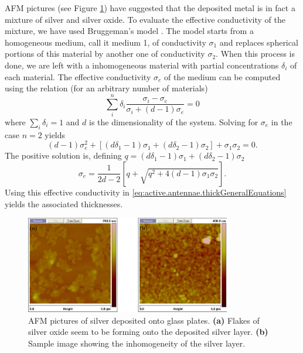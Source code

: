 AFM pictures (see Figure \ref{fig:active.lcx.AFM})  have suggested that the deposited
metal is in fact a mixture of silver and silver oxide. To evaluate
the effective conductivity of the mixture, we have used Bruggeman's model \cite{LAN1978}.
The model starts from a homogeneous medium, call it medium 1, 
of conductivity $\sigma_1$ and replaces spherical portions of this material 
by another one of conductivity $\sigma_2$. When this process is done, 
we are left with a inhomogeneous material with partial concentrations $\delta_i$
of each material. The effective conductivity $\sigma_e$ of the medium can be computed
using the relation (for an arbitrary number of materials)
  \begin{equation}
    \sum_i^n \delta_i \frac{\sigma_i-\sigma_e}{\sigma_i+(d-1)\sigma_e} =0 
  \end{equation}
where $\sum_i\delta_i=1$ and $d$ is the dimensionality of the system.
Solving for $\sigma_e$ in the case $n=2$ yields
  \begin{equation}
   (d-1)\sigma_e^2+\left[\left(d\delta_1-1\right)\sigma_1+\left(d\delta_2-1\right)\sigma_2\right]+\sigma_1\sigma_2=0.
  \end{equation}
The positive solution is, defining $q=\left(d\delta_1-1\right)\sigma_1+\left(d\delta_2-1\right)\sigma_2$
  \begin{equation}
   \label{eq:antenna:bruggeman}
   \sigma_e = \frac{1}{2d-2}\left[q+\sqrt{q^2+4(d-1)\sigma_1\sigma_2}\right].
  \end{equation}
Using this effective conductivity in \eqref{eq:active.antennae.thickGeneralEquations} yields 
the associated thicknesses. 

\begin{figure}
 \centering
 \includegraphics[width=0.8\textwidth]{figs/active/out/AFM.pdf}
 \caption[AFM pictures of silver deposited onto glass plates]
 		{AFM pictures of silver deposited onto glass plates. \textbf{(a)} Flakes of silver oxide seem to be forming onto the deposited
	  	silver layer. \textbf{(b)} Sample image showing the inhomogeneity of the
	  	silver layer.}
 \label{fig:active.lcx.AFM}
\end{figure}

